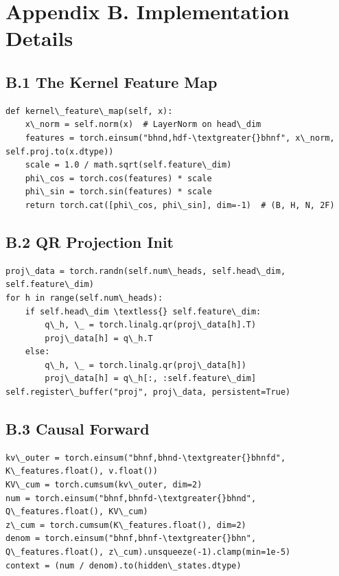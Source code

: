 \section{Appendix B. Implementation Details}

\subsection{B.1 The Kernel Feature Map}

\begin{lstlisting}
def kernel\_feature\_map(self, x):
    x\_norm = self.norm(x)  # LayerNorm on head\_dim
    features = torch.einsum("bhnd,hdf-\textgreater{}bhnf", x\_norm, self.proj.to(x.dtype))
    scale = 1.0 / math.sqrt(self.feature\_dim)
    phi\_cos = torch.cos(features) * scale
    phi\_sin = torch.sin(features) * scale
    return torch.cat([phi\_cos, phi\_sin], dim=-1)  # (B, H, N, 2F)
\end{lstlisting}

\subsection{B.2 QR Projection Init}

\begin{lstlisting}
proj\_data = torch.randn(self.num\_heads, self.head\_dim, self.feature\_dim)
for h in range(self.num\_heads):
    if self.head\_dim \textless{} self.feature\_dim:
        q\_h, \_ = torch.linalg.qr(proj\_data[h].T)
        proj\_data[h] = q\_h.T
    else:
        q\_h, \_ = torch.linalg.qr(proj\_data[h])
        proj\_data[h] = q\_h[:, :self.feature\_dim]
self.register\_buffer("proj", proj\_data, persistent=True)
\end{lstlisting}

\subsection{B.3 Causal Forward}

\begin{lstlisting}
kv\_outer = torch.einsum("bhnf,bhnd-\textgreater{}bhnfd", K\_features.float(), v.float())
KV\_cum = torch.cumsum(kv\_outer, dim=2)
num = torch.einsum("bhnf,bhnfd-\textgreater{}bhnd", Q\_features.float(), KV\_cum)
z\_cum = torch.cumsum(K\_features.float(), dim=2)
denom = torch.einsum("bhnf,bhnf-\textgreater{}bhn", Q\_features.float(), z\_cum).unsqueeze(-1).clamp(min=1e-5)
context = (num / denom).to(hidden\_states.dtype)
\end{lstlisting}

